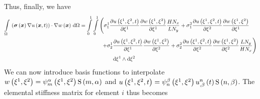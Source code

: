 Thus, finally, we have
\begin{equation}
  \begin{aligned}
    \gint{\Omega}{}{\dotprod{\pbrac{\fnof{\conductivitytensor}{\vectr{x}}\gradient{}{\fnof{u}{\vectr{x},t}}}}
      {\gradient{}{\fnof{w}{\vectr{x}}}}}{\Omega}
    &=\dintl{0}{1}\dintl{0}{1}\left(\conductivitytensorsymbol^{1}_{1}\delby{\fnof{u}{\xione,\xitwo,t}}{\xione}
    \delby{\fnof{w}{\xione,\xitwo}}{\xione}\dfrac{H N_{x}}{L N_{y}}+
    \conductivitytensorsymbol^{2}_{1}\delby{\fnof{u}{\xione,\xitwo,t}}{\xitwo}\delby{\fnof{w}{\xione,\xitwo}}{\xione}
    \right.\\
    &\qquad\qquad\left.+\conductivitytensorsymbol^{1}_{2}\delby{\fnof{u}{\xione,\xitwo,t}}{\xione}
    \delby{\fnof{w}{\xione,\xitwo}}{\xitwo}+
    \conductivitytensorsymbol^{2}_{2}\delby{\fnof{u}{\xione,\xitwo,t}}{\xitwo}
    \delby{\fnof{w}{\xione,\xitwo}}{\xitwo}\dfrac{L N_{y}}{H N_{x}}\right)\\
    &\qquad\qquad\qquad\infinitesimaltwo{\xione}{\xitwo}
  \end{aligned}
\end{equation}
We can now introduce basis functions to interpolate \ie
$ w\left( \xi^{1},\xi^{2} \right) =   \psi_{m}^{\alpha} \left( \xi^{1},\xi^{2} \right)     \mathrm{S} \left( m,\alpha \right)  $
and
$ u\left( \xi^{1},\xi^{2},t \right) =   \psi_{n}^{\beta} \left( \xi^{1},\xi^{2} \right)     {u}^{n} _{,\beta} \left( t \right)    \mathrm{S} \left( n,\beta \right)  $. The
elemental stiffness matrix for element $i$ thus becomes
